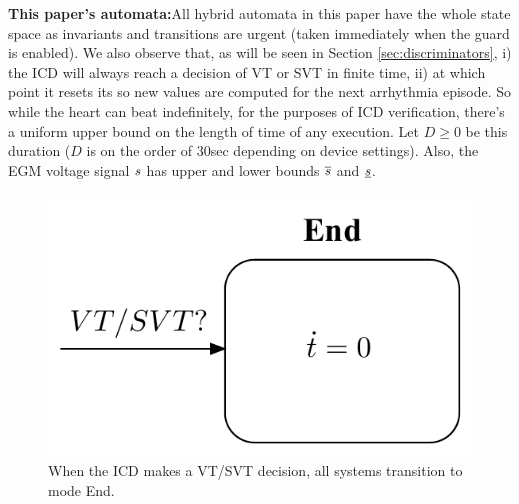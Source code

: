 \textbf{This paper's automata:}All hybrid automata in this paper have the whole state space as invariants and transitions are urgent (taken immediately when the guard is enabled).
We also observe that, as will be seen in Section \ref{sec:discriminators},
i) the \ac{ICD} will always reach a decision of VT or SVT in finite time, 
ii) at which point it resets its  so new values are computed for the next arrhythmia episode.
So while the heart can beat indefinitely, for the purposes of \ac{ICD} verification, 
there's a uniform upper bound on the length of time of any execution.
Let $D \geq 0$ be this duration ($D$ is on the order of 30sec depending on device settings).
Also, the \ac{EGM} voltage signal $s$ has upper and lower bounds $\overline{s}$ and $\underline{s}$.
\begin{figure}[t]
\centering
\includegraphics[scale=0.4]{figures/endMode}
\caption{When the ICD makes a VT/SVT decision, all systems transition to mode End.}
\label{fig:endMode}
\end{figure}

